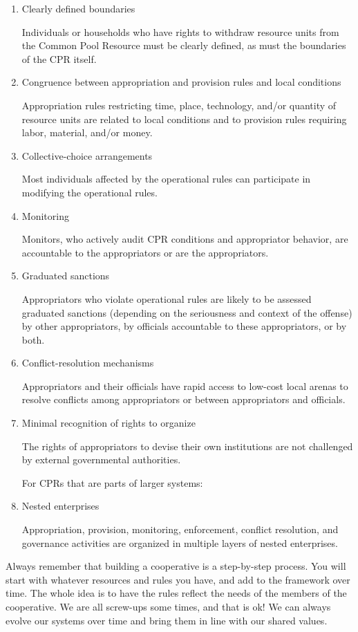 \documentclass{article}
\begin{document}
\begin{enumerate}

\item {Clearly defined boundaries}

Individuals or households who have rights to withdraw resource units from the Common Pool Resource must be clearly defined, as must the boundaries of the CPR itself.


\item{ Congruence between appropriation and provision rules and local conditions}

 Appropriation rules restricting time, place, technology, and/or quantity of resource units are related to local conditions and to provision rules requiring labor, material, and/or money.


\item{Collective-choice arrangements}

Most individuals affected by the operational rules can participate in modifying the operational rules.


\item{Monitoring}

Monitors, who actively audit CPR conditions and appropriator behavior, are accountable to the appropriators or are the appropriators.


\item{Graduated sanctions}

Appropriators who violate operational rules are likely to be assessed graduated sanctions (depending on the seriousness and context of the offense) by other appropriators, by officials accountable to these appropriators, or by both.


\item{Conflict-resolution mechanisms}

Appropriators and their officials have rapid access to low-cost local arenas to resolve conflicts among appropriators or between appropriators and officials.



\item{Minimal recognition of rights to organize}

The rights of appropriators to devise their own institutions are not challenged by external governmental authorities.

For CPRs that are parts of larger systems:

\item{Nested enterprises}

Appropriation, provision, monitoring, enforcement, conflict resolution, and governance activities are organized in multiple layers of nested enterprises.

\end{enumerate}
\vspace{0.2cm}
Always remember that building a cooperative is a step-by-step process. You will start with whatever resources and rules you have, and add to the framework over time. The whole idea is to have the rules reflect the needs of the members of the cooperative. We are all screw-ups some times, and that is ok! We can always evolve our systems over time and bring them in line with our shared values. 
\end{document}
